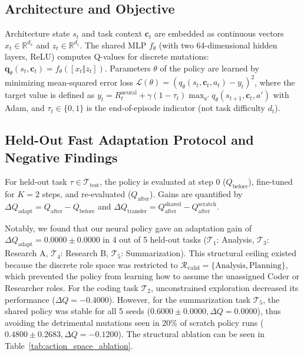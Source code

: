 ﻿\documentclass[conference]{IEEEtran}
\begin{document}
\subsection{Architecture and Objective}
Architecture state $s_t$ and task context $\mathbf{c}_t$ are embedded as continuous vectors $x_t \in \mathbb{R}^{d_x}$ and $z_t \in \mathbb{R}^{d_z}$. The shared MLP $f_\theta$ (with two 64-dimensional hidden layers, ReLU) computes Q-values for discrete mutations: $\mathbf{q}_\theta(s_t, \mathbf{c}_t) = f_\theta([x_t \Vert z_t])$. Parameters $\theta$ of the policy are learned by minimizing mean-squared error loss $\mathcal{L}(\theta) = (q_\theta(s_t, \mathbf{c}_t, a_t) - y_t)^2$, where the target value is defined as $y_t = R_t^{\mathrm{neural}} + \gamma(1 - \tau_t)\max_{a'} q_\theta(s_{t+1}, \mathbf{c}_t, a')$ with Adam, and $\tau_t \in \{0, 1\}$ is the end-of-episode indicator (not task difficulty $d_t$).

\subsection{Held-Out Fast Adaptation Protocol and Negative Findings}
For held-out task $\tau \in \mathcal{T}_{\mathrm{test}}$, the policy is evaluated at step 0 ($Q_{\mathrm{before}}$), fine-tuned for $K=2$ steps, and re-evaluated ($Q_{\mathrm{after}}$). Gains are quantified by $\Delta Q_{\mathrm{adapt}} = Q_{\mathrm{after}} - Q_{\mathrm{before}}$ and $\Delta Q_{\mathrm{transfer}} = Q_{\mathrm{after}}^{\mathrm{shared}} - Q_{\mathrm{after}}^{\mathrm{scratch}}$.

Notably, we found that our neural policy gave an adaptation gain of $\Delta Q_{\mathrm{adapt}} = \mathbf{0.0000 \pm 0.0000}$ in 4 out of 5 held-out tasks ($\mathcal{T}_1$: Analysis, $\mathcal{T}_3$: Research A, $\mathcal{T}_4$: Research B, $\mathcal{T}_5$: Summarization). This structural ceiling existed because the discrete role space was restricted to $\mathcal{R}_{\mathrm{valid}} = \{\text{Analysis}, \text{Planning}\}$, which prevented the policy from learning how to assume the unassigned Coder or Researcher roles. For the coding task $\mathcal{T}_2$, unconstrained exploration decreased its performance ($\Delta Q = -0.4000$). However, for the summarization task $\mathcal{T}_5$, the shared policy was stable for all 5 seeds ($0.6000 \pm 0.0000, \Delta Q = 0.0000$), thus avoiding the detrimental mutations seen in 20\% of scratch policy runs ($0.4800 \pm 0.2683, \Delta Q = -0.1200$). The structural ablation can be seen in Table~\ref{tab:action_space_ablation}.
\end{document}
